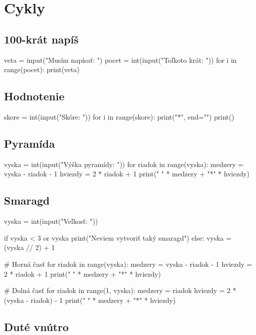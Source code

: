 \section{Cykly}

\subsection{100-krát napíš}
\begin{solution}
veta = input("Musím napísať: ")
pocet = int(input("Toľkoto krát: "))
for i in range(pocet):
    print(veta)
\end{solution}

\subsection{Hodnotenie}
\begin{solution}
skore = int(input("Skóre: "))
for i in range(skore):
    print("*", end="")
print()
\end{solution}

\subsection{Pyramída}
\begin{solution}
vyska = int(input("Výška pyramídy: "))
for riadok in range(vyska):
    medzery = vyska - riadok - 1
    hviezdy = 2 * riadok + 1
    print(" " * medzery + "*" * hviezdy)
\end{solution}

\subsection{Smaragd}
\begin{solution}
vyska = int(input("Veľkosť: "))

if vyska < 3 or vyska %
    print("Neviem vytvoriť taký smaragd")
else:
    vyska = (vyska // 2) + 1

    # Horná časť
    for riadok in range(vyska):
        medzery = vyska - riadok - 1
        hviezdy = 2 * riadok + 1
        print(" " * medzery + "*" * hviezdy)

    # Dolná časť
    for riadok in range(1, vyska):
        medzery = riadok
        hviezdy = 2 * (vyska - riadok) - 1
        print(" " * medzery + "*" * hviezdy)
\end{solution}


\subsection{Duté vnútro}

